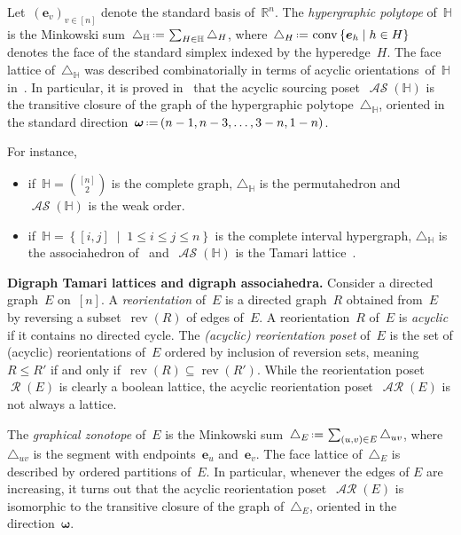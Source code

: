 \documentclass{amsart}
\theoremstyle{definition}
\newcommand{\R}{\mathbb{R}} %
\renewcommand{\b}[1]{\boldsymbol{#1}} %
\renewcommand{\c}[1]{\mathcal{#1}} %
\newcommand{\set}[2]{\left\{ #1 \;\middle|\; #2 \right\}} %
\newcommand{\eqdef}{\mbox{\,\raisebox{0.2ex}{\scriptsize\ensuremath{\mathrm:}}\ensuremath{=}\,}} %
\newcommand{\simplex}{\triangle} %
\DeclareMathOperator{\conv}{conv} %
\newcommand{\para}[1]{\bigskip\noindent\textbf{#1}} %
\newcommand{\darkblue}{\color{darkblue}} %
\newcommand{\defn}[1]{\textsl{\darkblue #1}} %
\newcommand{\Jose}[2][]{\todo[size=\tiny,color=red!30,#1]{ #2 \\ \hfill --- J.}\,}
\DeclareMathOperator{\Reori}{\c{R}}  %
\DeclareMathOperator{\AReori}{\c{AR}}  %
\DeclareMathOperator{\rev}{rev} %
\DeclareMathOperator{\ASour}{\mathcal{AS}}  %
\newcommand{\HH}{\mathbb H}  %
\begin{document}
Let~$(\b{e}_v)_{v \in [n]}$ denote the standard basis of~$\R^n$.
The \defn{hypergraphic polytope} of~$\HH$ is the Minkowski sum~$\simplex_\HH \eqdef \sum_{H \in \HH} \simplex_H$, where~$\simplex_H \eqdef \conv\set{\b{e}_h}{h \in H}$ denotes the face of the standard simplex indexed by the hyperedge~$H$.
The face lattice of~$\simplex_\HH$ was described combinatorially in terms of acyclic orientations\Jose{should we say "sourcings" here?} of~$\HH$ in~\cite{BenedettiBergeronMachacek}.
In particular, it is proved in~\cite{Gelinas} that the acyclic sourcing poset~$\ASour(\HH)$ is the transitive closure of the graph of the hypergraphic polytope~$\simplex_\HH$, oriented in the standard direction~$\b{\omega} \eqdef (n-1, n-3, \dots, 3-n, 1-n)$.

For instance, 
\begin{itemize}
\item if~$\HH = \binom{[n]}{2}$ is the complete graph, $\simplex_\HH$ is the permutahedron and $\ASour(\HH)$ is the weak order. %
\item if~$\HH = \set{[i,j]}{1 \le i \le j \le n}$ is the complete interval hypergraph, $\simplex_\HH$ is the associahedron of~\cite{ShniderSternberg,Loday} and~$\ASour(\HH)$ is the Tamari lattice~\cite{Tamari}.
\end{itemize}


\para{Digraph Tamari lattices and digraph associahedra.}
Consider a directed graph~$E$ on~$[n]$.
A \defn{reorientation} of~$E$ is a directed graph~$R$ obtained from~$E$ by reversing a subset~$\rev(R)$ of edges of~$E$.
A reorientation~$R$ of~$E$ is \defn{acyclic} if it contains no directed cycle.
The \defn{(acyclic) reorientation poset} of~$E$ is the set of (acyclic) reorientations of~$E$ ordered by inclusion of reversion sets, meaning~$R \le R'$ if and only if~$\rev(R) \subseteq \rev(R')$.
While the reorientation poset~$\Reori(E)$ is clearly a boolean lattice, the acyclic reorientation poset~$\AReori(E)$ is not always a lattice.

The \defn{graphical zonotope} of~$E$ is the Minkowski sum~$\simplex_E \eqdef \sum_{(u,v) \in E} \simplex_{uv}$, where~$\simplex_{uv}$ is the segment with endpoints~$\b{e}_u$ and~$\b{e}_v$.
The face lattice of~$\simplex_E$ is described by ordered partitions of~$E$.
In particular, whenever the edges of $E$ are increasing, it turns out that the acyclic reorientation poset~$\AReori(E)$ is isomorphic to the transitive closure of the graph of~$\simplex_E$, oriented in the direction~$\b{\omega}$.
\end{document}
